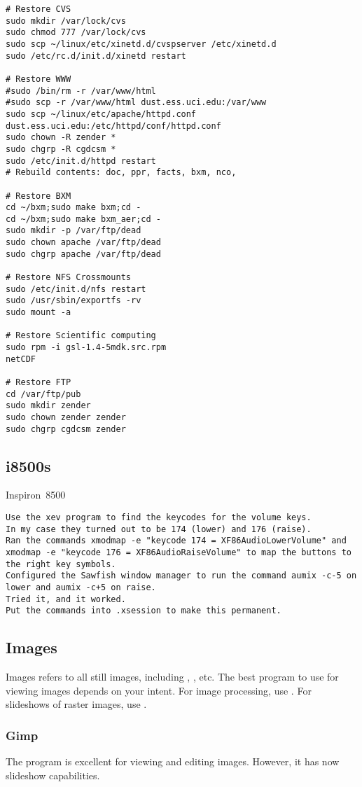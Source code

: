 \documentclass[12pt,twoside]{article}
\begin{document}
\begin{verbatim}
# Restore CVS
sudo mkdir /var/lock/cvs
sudo chmod 777 /var/lock/cvs
sudo scp ~/linux/etc/xinetd.d/cvspserver /etc/xinetd.d
sudo /etc/rc.d/init.d/xinetd restart

# Restore WWW
#sudo /bin/rm -r /var/www/html
#sudo scp -r /var/www/html dust.ess.uci.edu:/var/www
sudo scp ~/linux/etc/apache/httpd.conf dust.ess.uci.edu:/etc/httpd/conf/httpd.conf
sudo chown -R zender *
sudo chgrp -R cgdcsm *
sudo /etc/init.d/httpd restart
# Rebuild contents: doc, ppr, facts, bxm, nco, 

# Restore BXM
cd ~/bxm;sudo make bxm;cd -
cd ~/bxm;sudo make bxm_aer;cd -
sudo mkdir -p /var/ftp/dead
sudo chown apache /var/ftp/dead
sudo chgrp apache /var/ftp/dead

# Restore NFS Crossmounts
sudo /etc/init.d/nfs restart
sudo /usr/sbin/exportfs -rv
sudo mount -a

# Restore Scientific computing
sudo rpm -i gsl-1.4-5mdk.src.rpm
netCDF

# Restore FTP
cd /var/ftp/pub
sudo mkdir zender
sudo chown zender zender
sudo chgrp cgdcsm zender
\end{verbatim}

\subsection{i8500s}\label{sxn:i8500}
Inspiron~8500
\begin{verbatim}
Use the xev program to find the keycodes for the volume keys. 
In my case they turned out to be 174 (lower) and 176 (raise).  
Ran the commands xmodmap -e "keycode 174 = XF86AudioLowerVolume" and
xmodmap -e "keycode 176 = XF86AudioRaiseVolume" to map the buttons to
the right key symbols.  
Configured the Sawfish window manager to run the command aumix -c-5 on
lower and aumix -c+5 on raise.  
Tried it, and it worked. 
Put the commands into .xsession to make this permanent. 
\end{verbatim}

\subsection{Images}\label{sxn:img}
Images refers to all still images, including ,
, etc. 
The best program to use for viewing images depends on your intent.
For image processing, use .
For slideshows of raster images, use .
\subsubsection{Gimp}\label{sxn:gimp}
The  program is excellent for viewing and editing images.
However, it has now slideshow capabilities.
\end{document}
